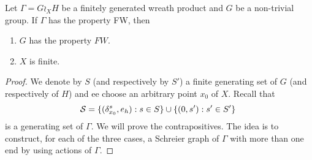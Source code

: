\begin{lem}\label{Lem:Wreath_groups_ends}
Let $\Gamma = G \wr_X H$ be a finitely generated wreath product and $G$ be a non-trivial group. If $\Gamma$ has the property FW, then 
\begin{enumerate}
\item $G$ has the property $FW$.
\item $X$ is finite.
\end{enumerate}
%
\begin{proof}
We denote by $S$ (and respectively by $S'$) a finite generating set of $G$ (and respectively of $H$) and ee choose an arbitrary point $x_0$ of $X$. Recall that 
\begin{equation*}
\S = \{(\delta_{x_0}^s, e_h) : s \in S \} \cup \{ (0, s') : s' \in S' \} 
\end{equation*}
is a generating set of $\Gamma$.
We will prove the contrapositives. The idea is to construct, for each of the three cases, a Schreier graph of $\Gamma$ with more than one end by using actions of $\Gamma$.


\end{proof}
\end{lem}
